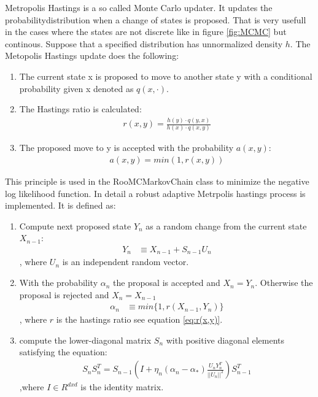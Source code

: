 \documentclass[english]{uzhpub}
\begin{document}
Metropolis Hastings is a so called Monte Carlo updater. It updates the probabilitydistribution when a change of states is proposed. That is very usefull in the cases where the states are not discrete like in figure \ref{fig:MCMC} but continous. Suppose that a specified distribution has unnormalized density $h$. The Metopolis Hastings update does the following:
\begin{enumerate}
  \item The current state x is proposed to move to another state y with a conditional probability given x denoted as $q(x,\cdot)$.
  \item The Hastings ratio is calculated:
  \begin{align}
    r(x,y) = \frac{h(y) \cdot q(y,x)}{h(x) \cdot q(x,y)} \label{eq:r(x,y)}
  \end{align}
  \item The proposed move to y is accepted with the probability $a(x,y)$:
  \begin{align}
    a(x,y) = min(1,r(x,y))
  \end{align}
\end{enumerate}

This principle is used in the RooMCMarkovChain class to minimize the negative log likelihood function. In detail a robust adaptive Metrpolis hastings process is implemented. It is defined as:
\begin{enumerate}
  \item  Compute next proposed state $Y_n$ as a random change from the current state $X_{n-1}$:
  \begin{align*}   Y_n &\equiv X_{n-1} + S_{n-1} U_n    \end{align*}
  , where $U_n$ is an independent random vector.
  \item With the probability $\alpha_n$ the proposal is accepted and $X_n = Y_n$. Otherwise the proposal is rejected and $X_n = X_{n-1}$
  \begin{align*}  \alpha_n &\equiv min\{ 1, r(X_{n-1},Y_n) \} \end{align*}
  , where $r$ is the hastings ratio see equation \ref{eq:r(x,y)}.
  \item compute the lower-diagonal matrix $S_n$ with positive diagonal elements satisfying the equation:
  \begin{align}
    S_n S_n^T = S_{n-1} \left( I + \eta_n(\alpha_n - \alpha_*) \frac{U_n Y_n^T}{||U_n||^2} \right) S_{n-1}^T
  \end{align}
  ,where $I \in R^{dxd}$ is the identity matrix.
\end{enumerate}
\end{document}
